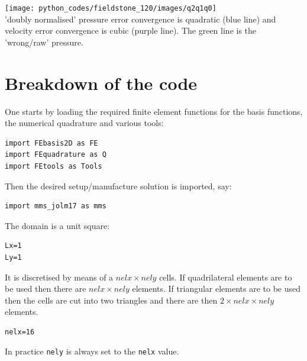 \begin{center}
\texttt{[image: python\_codes/fieldstone\_120/images/q2q1q0]}\\
{\captionfont 'doubly normalised' pressure error convergence is quadratic (blue line) and 
velocity error convergence is cubic (purple line). The green line is the 'wrong/raw' pressure. }
\end{center}




\newpage
\section*{Breakdown of the code}

One starts by loading the required finite element functions 
for the basis functions, the numerical quadrature and various tools:
\begin{lstlisting}
import FEbasis2D as FE
import FEquadrature as Q
import FEtools as Tools 
\end{lstlisting}

Then the desired setup/manufacture solution is imported, say:
\begin{lstlisting}
import mms_jolm17 as mms
\end{lstlisting}


The domain is a unit square:
\begin{lstlisting}
Lx=1
Ly=1
\end{lstlisting}

It is discretised by means of a $nelx\times nely$ cells. If quadrilateral 
elements are to be used then there are $nelx\times nely$ elements. If 
triangular elements are to be used then the cells are cut into two 
triangles and there are then $2\times nelx\times nely$ elements.

\begin{lstlisting}
nelx=16
\end{lstlisting}
In practice \lstinline{nely} is always set to the \lstinline{nelx} value.



